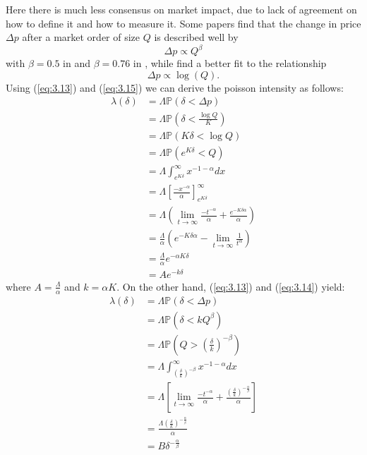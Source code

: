 Here there is much less consensus on market impact, due to lack of
agreement on how to define it and how to measure it. Some papers
find that the change in price $\Delta p$ after a market order of size 
$Q$ is described well by 
\begin{equation}\label{eq:3.14}
    \Delta p\propto Q^\beta
\end{equation}
with $\beta=0.5$ in \cite{Gabaix2006} and $\beta=0.76$ in \cite{Weber2005},
while \cite{Potters2003} find a better fit to the relationship
\begin{equation}\label{eq:3.15}
    \Delta p\propto\log(Q).
\end{equation}
Using (\ref{eq:3.13}) and (\ref{eq:3.15}) we can derive the poisson 
intensity as follows:
\begin{align*}
    \lambda(\delta)&=\Lambda\mathbb{P}(\delta<\Delta p)\\
    &=\Lambda\mathbb{P}\left(\delta<\frac{\log Q}{K}\right)\\
    &=\Lambda\mathbb{P}(K\delta<\log Q)\\
    &=\Lambda\mathbb{P}\left(e^{K\delta}<Q\right)\\
    &=\Lambda\int_{e^{K\delta}}^{\infty}x^{-1-\alpha}dx\\
    &=\Lambda\left[\frac{-x^{-\alpha}}{\alpha}\right]_{e^{K\delta}}^\infty\\
    &=\Lambda\left(\lim_{t\rightarrow\infty}\frac{-t^{-\alpha}}{\alpha}+\frac{e^{-K\delta\alpha}}{\alpha}\right)\\
    &=\frac{\Lambda}{\alpha}\left(e^{-K\delta\alpha}-\lim_{t\rightarrow\infty}\frac{1}{t^\alpha}\right)\\
    &=\frac{\Lambda}{\alpha}e^{-\alpha K\delta}\\
    &=Ae^{-k\delta}
\end{align*}
where $A=\frac{\Lambda}{\alpha}$ and $k=\alpha K$. 
On the other hand, (\ref{eq:3.13}) and (\ref{eq:3.14}) yield:
\begin{align*}
    \lambda(\delta)&=\Lambda\mathbb{P}(\delta<\Delta p)\\
    &=\Lambda\mathbb{P}(\delta<kQ^\beta)\\
    &=\Lambda\mathbb{P}\left(Q>\left(\frac{\delta}{k}\right)^{-\beta}\right)\\
    &=\Lambda\int_{\left(\frac{\delta}{k}\right)^{-\beta}}^\infty x^{-1-\alpha}dx\\
    &=\Lambda\left[\lim_{t\rightarrow\infty}\frac{-t^{-\alpha}}{\alpha}+\frac{\left(\frac{\delta}{k}\right)^{-\frac{\alpha}{\beta}}}{\alpha}\right]\\
    &=\frac{\Lambda\left(\frac{\delta}{k}\right)^{-\frac{\alpha}{\beta}}}{\alpha}\\
    &=B\delta^{-\frac{\alpha}{\beta}}
\end{align*}
